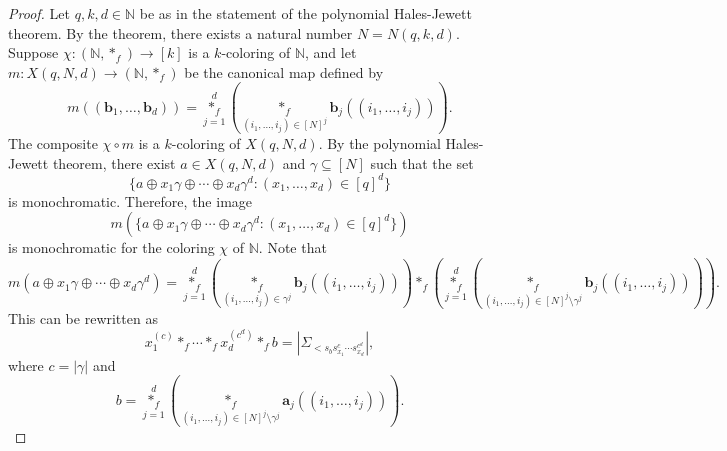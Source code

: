 \documentclass[10pt,a4paper]{amsart}
\begin{document}
\begin{proof}
Let \( q, k, d \in \mathbb{N} \) be as in the statement of the polynomial Hales-Jewett theorem. By the theorem, there exists a natural number \( N = N(q, k, d) \). Suppose \( \chi : (\mathbb{N}, \ast_f) \to [k] \) is a \( k \)-coloring of \( \mathbb{N} \), and let \( m : X(q, N, d) \to (\mathbb{N}, \ast_f) \) be the canonical map defined by
\[
m((\mathbf{b}_1, \dots, \mathbf{b}_d)) = \overset{d}{\underset{j=1}{\ast_f}} \left( \underset{(i_1, \dots, i_j) \in [N]^j}{\ast_f} \mathbf{b}_j((i_1, \dots, i_j)) \right).
\]
The composite \( \chi \circ m \) is a \( k \)-coloring of \( X(q, N, d) \). By the polynomial Hales-Jewett theorem, there exist \( a \in X(q, N, d) \) and \( \gamma \subseteq [N] \) such that the set
\[
\{ a \oplus x_1 \gamma \oplus \cdots \oplus x_d \gamma^d : (x_1, \dots, x_d) \in [q]^d \}
\]
is monochromatic. Therefore, the image
\[
m\left(\{ a \oplus x_1 \gamma \oplus \cdots \oplus x_d \gamma^d : (x_1, \dots, x_d) \in [q]^d \}\right)
\]
is monochromatic for the coloring \( \chi \) of \( \mathbb{N} \). Note that
\[
m(a \oplus x_1 \gamma \oplus \cdots \oplus x_d \gamma^d) = \overset{d}{\underset{j=1}{\ast_f}} \left( \underset{(i_1, \dots, i_j) \in \gamma^j}{\ast_f} \mathbf{b}_j((i_1, \dots, i_j)) \right) \ast_f \left( \overset{d}{\underset{j=1}{\ast_f}} \left( \underset{(i_1, \dots, i_j) \in [N]^j \setminus \gamma^j}{\ast_f} \mathbf{b}_j((i_1, \dots, i_j)) \right) \right).
\]
This can be rewritten as
\[
x_1^{(c)} \ast_f \cdots \ast_f x_d^{(c^d)} \ast_f b = |\Sigma_{<  s_b s_{x_1}^{c} \cdots s_{x_d}^{c^d}}|,
\]
where \( c = |\gamma| \) and
\[
b = \overset{d}{\underset{j=1}{\ast_f}} \left( \underset{(i_1, \dots, i_j) \in [N]^j \setminus \gamma^j}{\ast_f} \mathbf{a}_j((i_1, \dots, i_j)) \right).
\]
\end{proof}
\end{document}
